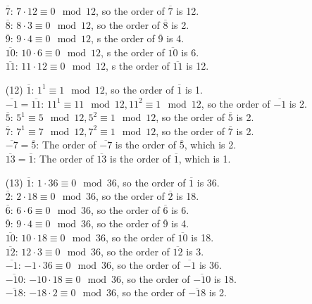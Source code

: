 \documentclass[12pt]{article}
\begin{document}
\begin{itemize}
$\overline{7}$: $7 \cdot 12 \equiv 0 \mod 12$, so the order of $\overline{7}$ is 12. \\
$\overline{8}$: $8 \cdot 3 \equiv 0 \mod 12$, so the order of $\overline{8}$ is 2. \\
$\overline{9}$: $9 \cdot 4 \equiv 0 \mod 12$, s the order of $\overline{9}$ is 4. \\
$\overline{10}$: $10 \cdot 6 \equiv 0 \mod 12$, s the order of $\overline{10}$ is 6. \\
$\overline{11}$: $11 \cdot 12 \equiv 0 \mod 12$, s the order of $\overline{11}$ is 12.
\item[(12)]
$\overline{1}$: $1^1 \equiv 1 \mod 12$, so the order of $\overline{1}$ is 1.\\
$\overline{-1} = \overline{11}$: $11^1 \equiv 11 \mod 12, 11^2 \equiv 1 \mod 12$, so the order of $\overline{-1}$ is 2. \\
$\overline{5}$: $5^1 \equiv 5 \mod 12, 5^2 \equiv 1 \mod 12$, so the order of $\overline{5}$ is 2.\\
$\overline{7}$: $7^1 \equiv 7 \mod 12, 7^2 \equiv 1 \mod 12$, so the order of $\overline{7}$ is 2.\\
$\overline{-7} = \overline{5}$: The order of $\overline{-7}$ is the order of $\overline{5}$, which is 2.\\
$\overline{13} = \overline{1}$: The order of $\overline{13}$ is the order of $\overline{1}$, which is 1. 
\item[(13)]
$\overline{1}$: $1 \cdot 36 \equiv 0 \mod 36$, so the order of $\overline{1}$ is 36. \\
$\overline{2}$: $2 \cdot 18 \equiv 0 \mod 36$, so the order of $\overline{2}$ is 18.\\
$\overline{6}$: $6 \cdot 6 \equiv 0 \mod 36$, so the order of $\overline{6}$ is 6.\\
$\overline{9}$: $9 \cdot 4 \equiv 0 \mod 36$, so the order of $\overline{9}$ is 4.\\
$\overline{10}$: $10 \cdot 18 \equiv 0 \mod 36$, so the order of $\overline{10}$ is 18. \\ 
$\overline{12}$: $12 \cdot 3 \equiv 0 \mod 36$, so the order of $\overline{12}$ is 3.\\
$\overline{-1}$: $-1 \cdot 36 \equiv 0 \mod 36$, so the order of $\overline{-1}$ is 36.\\
$\overline{-10}$: $-10 \cdot 18 \equiv 0 \mod 36$, so the order of $\overline{-10}$ is 18.\\
$\overline{-18}$: $-18 \cdot 2 \equiv 0 \mod 36$, so the order of $\overline{-18}$ is 2.

\end{itemize}
\end{document}

